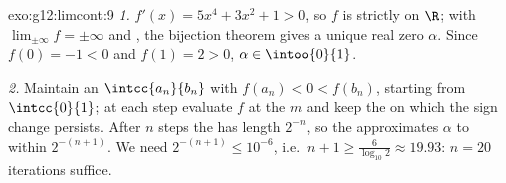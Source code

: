 \begin{solution}{exo:g12:limcont:9}
\emph{1.} $f'(x) = 5x^4 + 3x^2 + 1 > 0$, so $f$ is strictly  on
$\R$; with $\lim_{\pm\infty} f = \pm\infty$ and , the bijection
theorem gives a unique real zero $\alpha$. Since $f(0) = -1 < 0$ and
$f(1) = 2 > 0$, $\alpha \in \intoo{0}{1}$.

\emph{2.} Maintain an  $\intcc{a_n}{b_n}$ with
$f(a_n) < 0 < f(b_n)$, starting from $\intcc{0}{1}$; at each step evaluate
$f$ at the  $m$ and keep the  on which the sign change
persists. After $n$ steps the  has length $2^{-n}$, so the 
approximates $\alpha$ to within $2^{-(n+1)}$. We need
$2^{-(n+1)} \leq 10^{-6}$, i.e.\ $n + 1 \geq \frac{6}{\log_{10} 2} \approx 19.93$:
$n = 20$ iterations suffice.
\end{solution}

